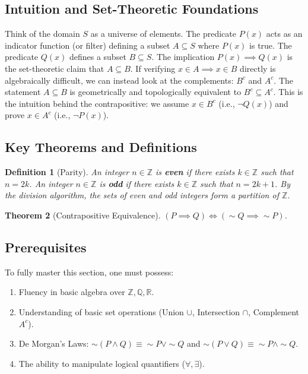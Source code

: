 \documentclass[11pt]{article}
\newtheorem{theorem}{Theorem}[section]
\newtheorem{definition}[theorem]{Definition}
\begin{document}
\subsection{Intuition and Set-Theoretic Foundations}
Think of the domain $S$ as a universe of elements. The predicate $P(x)$ acts as an indicator function (or filter) defining a subset $A \subseteq S$ where $P(x)$ is true. The predicate $Q(x)$ defines a subset $B \subseteq S$. The implication $P(x) \implies Q(x)$ is the set-theoretic claim that $A \subseteq B$. 
If verifying $x \in A \implies x \in B$ directly is algebraically difficult, we can instead look at the complements: $B^c$ and $A^c$. The statement $A \subseteq B$ is geometrically and topologically equivalent to $B^c \subseteq A^c$. This is the intuition behind the contrapositive: we assume $x \in B^c$ (i.e., $\neg Q(x)$) and prove $x \in A^c$ (i.e., $\neg P(x)$). 

\subsection{Key Theorems and Definitions}
\begin{definition}[Parity]
An integer $n \in \mathbb{Z}$ is \textbf{even} if there exists $k \in \mathbb{Z}$ such that $n = 2k$. An integer $n \in \mathbb{Z}$ is \textbf{odd} if there exists $k \in \mathbb{Z}$ such that $n = 2k + 1$. By the division algorithm, the sets of even and odd integers form a partition of $\mathbb{Z}$.
\end{definition}
\begin{theorem}[Contrapositive Equivalence]
$(P \implies Q) \iff (\sim Q \implies \sim P)$.
\end{theorem}

\subsection{Prerequisites}
To fully master this section, one must possess:
\begin{enumerate}
    \item Fluency in basic algebra over $\mathbb{Z}, \mathbb{Q}, \mathbb{R}$.
    \item Understanding of basic set operations (Union $\cup$, Intersection $\cap$, Complement $A^c$).
    \item De Morgan's Laws: $\sim(P \land Q) \equiv \sim P \lor \sim Q$ and $\sim(P \lor Q) \equiv \sim P \land \sim Q$.
    \item The ability to manipulate logical quantifiers ($\forall, \exists$).
\end{enumerate}
\end{document}
